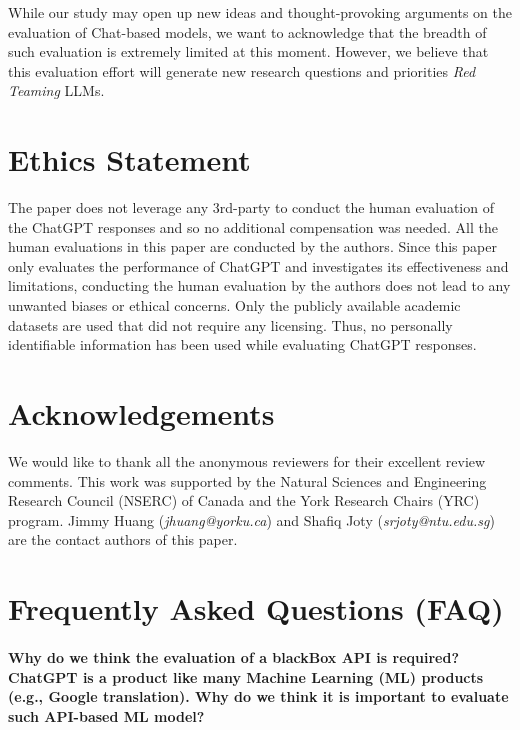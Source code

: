 \documentclass[11pt]{article}
\begin{document}
While our study may open up new ideas and thought-provoking arguments on the evaluation of Chat-based models, we want to acknowledge that the breadth of such evaluation is extremely limited at this moment. However, we believe that this evaluation effort will generate new research questions and priorities \emph{Red Teaming} LLMs.










\section{Ethics Statement}
 The paper does not leverage any 3rd-party to conduct the human evaluation of the ChatGPT responses and so no additional compensation was needed. All the human evaluations in this paper are conducted by the authors. Since this paper only evaluates the performance of ChatGPT and investigates its effectiveness and limitations, conducting the human evaluation by the authors does not lead to any unwanted biases or ethical concerns. Only the publicly available academic datasets are used that did not require any licensing. Thus, no personally identifiable information has been used while evaluating ChatGPT responses. 
 \section*{Acknowledgements} 
We would like to thank all the anonymous reviewers for their excellent review comments. This work was supported by the Natural Sciences and Engineering Research Council (NSERC) of Canada and the York Research Chairs (YRC) program. Jimmy Huang (\emph{jhuang@yorku.ca}) and Shafiq Joty (\emph{srjoty@ntu.edu.sg}) are the contact authors of this paper.  






\appendix
\label{sec:appendix}
\section{Frequently Asked Questions (FAQ)}

\paragraph{Why do we think the evaluation of a blackBox API is required? ChatGPT is a product like many Machine Learning (ML) products (e.g., Google translation). Why do we think it is important to evaluate such API-based ML model?}
\end{document}
